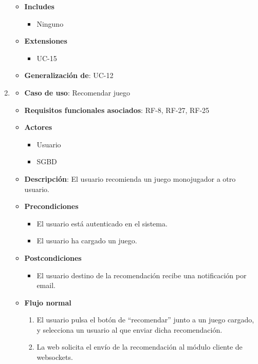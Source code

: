 \begin{enumerate}
\begin{itemize}
\begin{enumerate}
    \end{enumerate}
  \item \textbf{Includes}
    \begin{itemize}
    \item Ninguno
    \end{itemize}
  \item \textbf{Extensiones}
    \begin{itemize}
    \item UC-15
    \end{itemize}
  \item \textbf{Generalización de}: UC-12
  \end{itemize}

\item %
  \begin{itemize}
  \item \textbf{Caso de uso}: Recomendar juego
  \item \textbf{Requisitos funcionales asociados}: RF-8, RF-27, RF-25
  \item \textbf{Actores}
    \begin{itemize}
    \item Usuario
    \item SGBD
    \end{itemize}
  \item \textbf{Descripción}: El usuario recomienda un juego monojugador a otro usuario.
  \item \textbf{Precondiciones}
    \begin{itemize}
    \item El usuario está autenticado en el sistema.
    \item El usuario ha cargado un juego.
    \end{itemize}
  \item \textbf{Postcondiciones}
    \begin{itemize}
    \item El usuario destino de la recomendación recibe una notificación por email.
    \end{itemize}
  \item \textbf{Flujo normal}
    \begin{enumerate}
    \item El usuario pulsa el botón de ``recomendar'' junto a un juego cargado, y selecciona un usuario al que enviar dicha recomendación.
    \item La web solicita el envío de la recomendación al módulo cliente de websockets.

\end{enumerate}
\end{itemize}
\end{enumerate}
